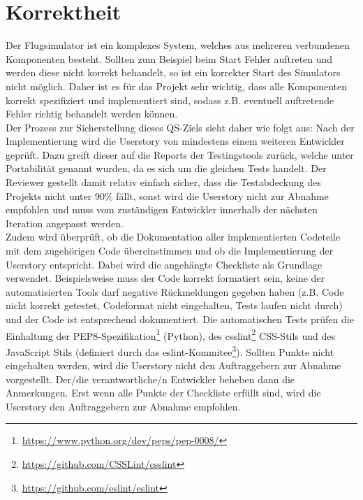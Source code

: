 \documentclass[accentcolor=tud9c,12pt,paper=a4]{tudreport}
\begin{document}
		\section{Korrektheit}
		Der Flugsimulator ist ein komplexes System, welches aus mehreren verbundenen Komponenten besteht.
		Sollten zum Beispiel beim Start Fehler auftreten und werden diese nicht korrekt behandelt, so
		ist ein korrekter Start des Simulators nicht möglich. Daher ist es für das Projekt
		sehr wichtig, dass alle Komponenten korrekt spezifiziert und implementiert sind,
		sodass z.B. eventuell auftretende Fehler richtig behandelt werden können.
		\\[5pt]
		Der Prozess zur Sicherstellung dieses QS-Ziels sieht daher wie folgt aus:
		Nach der Implementierung wird die Userstory von mindestens einem weiteren
		Entwickler geprüft. Dazu greift dieser auf die Reports der Testingstools zurück,
		welche unter Portabilität genannt wurden, da es sich um die gleichen Tests handelt.
		Der Reviewer gestellt damit relativ einfach sicher, dass die Testabdeckung des Projekts
		nicht unter 90\% fällt, sonst wird die Userstory nicht zur Abnahme empfohlen und
		muss vom zuständigen Entwickler innerhalb der nächsten Iteration angepasst werden.
		\\[5pt]
		Zudem wird überprüft, ob die Dokumentation aller implementierten
		Codeteile mit dem zugehörigen Code übereinstimmen und ob die Implementierung der
		Userstory entspricht. Dabei wird die angehängte Checkliste als Grundlage verwendet.
		Beispielsweise muss der Code korrekt formatiert sein, keine der automatisierten Tools
		darf negative Rückmeldungen gegeben haben (z.B. Code nicht korrekt getestet, Codeformat
		nicht eingehalten, Tests laufen nicht durch) und der Code ist entsprechend dokumentiert.
		Die automatischen Tests prüfen die Einhaltung der PEP8-Spezifikation\footnote{\url{https://www.python.org/dev/peps/pep-0008/}}
		(Python), des csslint\footnote{\url{https://github.com/CSSLint/csslint}} CSS-Stils und
		des JavaScript Stils (definiert durch das eslint-Kommitee\footnote{\url{https://github.com/eslint/eslint}}).
		Sollten Punkte nicht eingehalten werden, wird die Userstory nicht den Auftraggebern zur
		Abnahme vorgestellt. Der/die verantwortliche/n Entwickler beheben dann die Anmerkungen.
		Erst wenn alle Punkte der Checkliste erfüllt sind, wird die Userstory den Auftraggebern
		zur Abnahme empfohlen.
		\newpage
\end{document}
